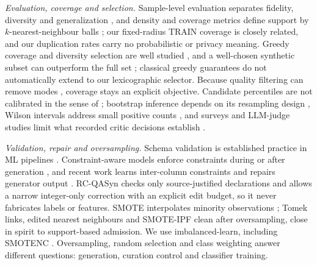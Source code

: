 \textit{Evaluation, coverage and selection.} Sample-level evaluation separates fidelity, diversity and generalization \cite{alaa2022faithful}, and density and coverage metrics define support by $k$-nearest-neighbour balls \cite{naeem2020reliable}; our fixed-radius TRAIN coverage is closely related, and our duplication rates carry no probabilistic or privacy meaning. Greedy coverage and diversity selection are well studied \cite{nemhauser1978submodular,sener2018coreset}, and a well-chosen synthetic subset can outperform the full set \cite{tavakkol2025less}; classical greedy guarantees do not automatically extend to our lexicographic selector. Because quality filtering can remove modes \cite{stevenson2026collapse}, coverage stays an explicit objective. Candidate percentiles are not calibrated in the sense of \cite{guo2017calibration}; bootstrap inference depends on its resampling design \cite{efron1979bootstrap}, Wilson intervals address small positive counts \cite{brown2001interval}, and surveys and LLM-judge studies limit what recorded critic decisions establish \cite{long2024survey,zheng2023judging}.

\textit{Validation, repair and oversampling.} Schema validation is established practice in ML pipelines \cite{breck2019validation}. Constraint-aware models enforce constraints during or after generation \cite{stoian2024realistic}, and recent work learns inter-column constraints and repairs generator output \cite{zhao2026constraint}. RC-QASyn checks only source-justified declarations and allows a narrow integer-only correction with an explicit edit budget, so it never fabricates labels or features. SMOTE interpolates minority observations \cite{chawla2002smote}; Tomek links, edited nearest neighbours \cite{batista2004study} and SMOTE-IPF \cite{saez2015smoteipf} clean after oversampling, close in spirit to support-based admission. We use imbalanced-learn, including SMOTENC \cite{lemaitre2017imbalanced}. Oversampling, random selection and class weighting answer different questions: generation, curation control and classifier training.
